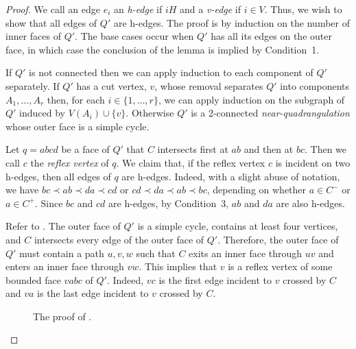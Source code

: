 \documentclass{patmorin}
\begin{document}
\begin{proof}
   We call an edge $e_i$ an \emph{h-edge} if $i H$ and a \emph{v-edge}
   if $i\in V$. Thus, we wish to show that all edges of $Q'$ are h-edges.  
   The proof is by induction on the number of inner
   faces of $Q'$.  The base cases occur when $Q'$ has all its edges on
   the outer face, in which case the conclusion of the lemma is implied
   by Condition~1.

   If $Q'$ is not connected then we can apply induction to each component
   of $Q'$ separately. If $Q'$ has a cut vertex, $v$, whose removal
   separates $Q'$ into components $A_1,\ldots,A_r$ then, for each
   $i\in\{1,\ldots,r\}$, we can apply induction on the subgraph of $Q'$
   induced by $V(A_i)\cup\{v\}$.  
   Otherwise $Q'$ is a 2-connected \emph{near-quadrangulation} whose outer face 
   is a simple cycle.

   Let $q=abcd$ be a face of $Q'$ that $C$ intersects first at $ab$
   and then at $bc$.  Then we call $c$ the \emph{reflex vertex} of $q$.
   We claim that, if the reflex vertex $c$ is incident on two h-edges,
   then all edges of $q$ are h-edges. Indeed, with a slight abuse of
   notation, we have $bc \prec ab\prec da\prec cd$ or $cd \prec da\prec
   ab\prec bc$, depending on whether $a\in C^-$ or $a\in C^+$.  Since $bc$
   and $cd$ are h-edges, by Condition~3, $ab$ and $da$ are also h-edges.

   Refer to .  The outer face of $Q'$ is a
   simple cycle, contains at least four vertices, and $C$ intersects
   every edge of the outer face of $Q'$.  Therefore,  
   the outer face of $Q'$ must contain a path
   $u,v,w$ such that $C$ exits an inner face through $uv$ and enters
   an inner face through $vw$.  This implies that $v$ is a reflex vertex
   of some bounded face $vabc$ of $Q'$.  Indeed, $vc$ is the first edge
   incident to $v$ crossed by $C$ and $va$ is the last edge incident to
   $v$ crossed by $C$.

  \begin{figure}
     \caption{The proof of .}
  \end{figure}
   

\end{proof}
\end{document}
